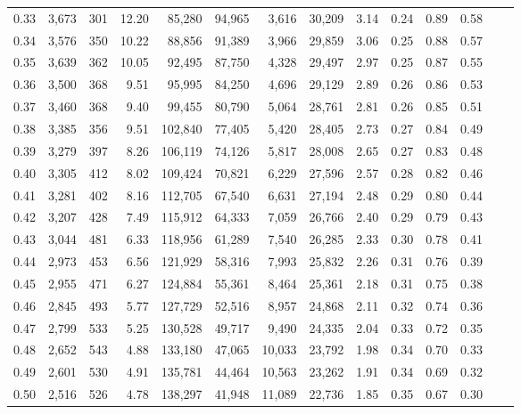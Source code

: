 \begin{tabular}{rrrrrrrrrrrrrr}
0.33 &  3,673 &  301 &   12.20 &   85,280 &   94,965 &   3,616 &  30,209 &  3.14 &  0.24 &  0.89 &      0.58 \\
0.34 &  3,576 &  350 &   10.22 &   88,856 &   91,389 &   3,966 &  29,859 &  3.06 &  0.25 &  0.88 &      0.57 \\
0.35 &  3,639 &  362 &   10.05 &   92,495 &   87,750 &   4,328 &  29,497 &  2.97 &  0.25 &  0.87 &      0.55 \\
0.36 &  3,500 &  368 &    9.51 &   95,995 &   84,250 &   4,696 &  29,129 &  2.89 &  0.26 &  0.86 &      0.53 \\
0.37 &  3,460 &  368 &    9.40 &   99,455 &   80,790 &   5,064 &  28,761 &  2.81 &  0.26 &  0.85 &      0.51 \\
0.38 &  3,385 &  356 &    9.51 &  102,840 &   77,405 &   5,420 &  28,405 &  2.73 &  0.27 &  0.84 &      0.49 \\
0.39 &  3,279 &  397 &    8.26 &  106,119 &   74,126 &   5,817 &  28,008 &  2.65 &  0.27 &  0.83 &      0.48 \\
0.40 &  3,305 &  412 &    8.02 &  109,424 &   70,821 &   6,229 &  27,596 &  2.57 &  0.28 &  0.82 &      0.46 \\
0.41 &  3,281 &  402 &    8.16 &  112,705 &   67,540 &   6,631 &  27,194 &  2.48 &  0.29 &  0.80 &      0.44 \\
0.42 &  3,207 &  428 &    7.49 &  115,912 &   64,333 &   7,059 &  26,766 &  2.40 &  0.29 &  0.79 &      0.43 \\
0.43 &  3,044 &  481 &    6.33 &  118,956 &   61,289 &   7,540 &  26,285 &  2.33 &  0.30 &  0.78 &      0.41 \\
0.44 &  2,973 &  453 &    6.56 &  121,929 &   58,316 &   7,993 &  25,832 &  2.26 &  0.31 &  0.76 &      0.39 \\
0.45 &  2,955 &  471 &    6.27 &  124,884 &   55,361 &   8,464 &  25,361 &  2.18 &  0.31 &  0.75 &      0.38 \\
0.46 &  2,845 &  493 &    5.77 &  127,729 &   52,516 &   8,957 &  24,868 &  2.11 &  0.32 &  0.74 &      0.36 \\
0.47 &  2,799 &  533 &    5.25 &  130,528 &   49,717 &   9,490 &  24,335 &  2.04 &  0.33 &  0.72 &      0.35 \\
0.48 &  2,652 &  543 &    4.88 &  133,180 &   47,065 &  10,033 &  23,792 &  1.98 &  0.34 &  0.70 &      0.33 \\
0.49 &  2,601 &  530 &    4.91 &  135,781 &   44,464 &  10,563 &  23,262 &  1.91 &  0.34 &  0.69 &      0.32 \\
0.50 &  2,516 &  526 &    4.78 &  138,297 &   41,948 &  11,089 &  22,736 &  1.85 &  0.35 &  0.67 &      0.30 \\

\end{tabular}
